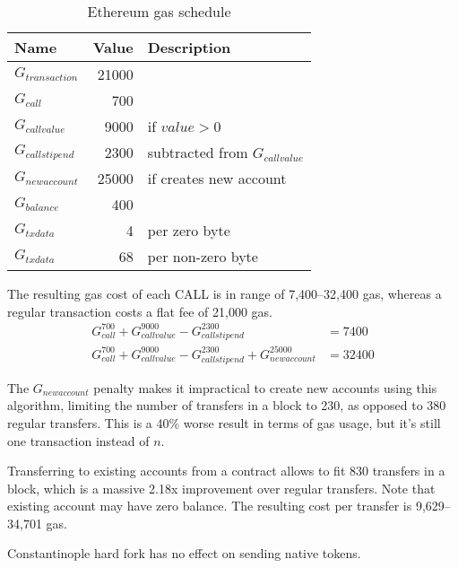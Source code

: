 \documentclass[12pt]{article}
\begin{document}
\begin{table}[h]
\caption{Ethereum gas schedule}
\label{gas-costs-2}
\begin{center}
\begin{tabular}{l r l}
	Name & Value & Description \\ \midrule
	$G_{transaction}$ & 21000 \\
	$G_{call}$ & 700 \\
	$G_{callvalue}$ & 9000 & if $value > 0$ \\
	$G_{callstipend}$ & 2300 & subtracted from $G_{callvalue}$ \\
	$G_{newaccount}$ & 25000 & if creates new account \\
	$G_{balance}$ & 400 \\
	$G_{txdata}$ & 4 & per zero byte \\
	$G_{txdata}$ & 68 & per non-zero byte \\

\end{tabular}
\end{center}
\end{table}

The resulting gas cost of each CALL\cite{subtleties} is in range of 7,400--32,400 gas, whereas a regular transaction costs a flat fee of 21,000 gas.
%
\begin{align}
G_{call}^{700} + G_{callvalue}^{9000} - G_{callstipend}^{2300} &= 7400 \\
G_{call}^{700} + G_{callvalue}^{9000} - G_{callstipend}^{2300} + G_{newaccount}^{25000} &= 32400
\end{align}

The $G_{newaccount}$ penalty makes it impractical to create new accounts using this algorithm, limiting the number of transfers in a block to 230, as opposed to 380 regular transfers.
This is a 40\% worse result in terms of gas usage, but it's still one transaction instead of $n$.

Transferring to existing accounts from a contract allows to fit 830 transfers in a block, which is a massive 2.18x improvement over regular transfers.
Note that existing account may have zero balance.
The resulting cost per transfer is 9,629--34,701 gas.

Constantinople hard fork has no effect on sending native tokens.
\end{document}
